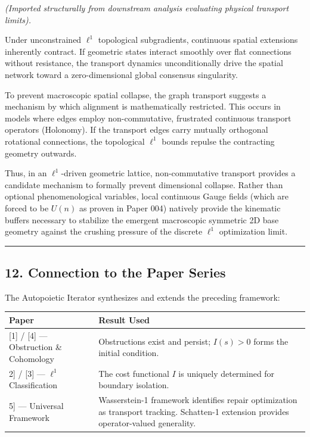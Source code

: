 \documentclass[
]{article}
\begin{document}
\emph{(Imported structurally from downstream analysis evaluating
physical transport limits).}

Under unconstrained \(\ell^1\) topological subgradients, continuous
spatial extensions inherently contract. If geometric states interact
smoothly over flat connections without resistance, the transport
dynamics unconditionally drive the spatial network toward a
zero-dimensional global consensus singularity.

To prevent macroscopic spatial collapse, the graph transport suggests a
mechanism by which alignment is mathematically restricted. This occurs
in models where edges employ non-commutative, frustrated continuous
transport operators (Holonomy). If the transport edges carry mutually
orthogonal rotational connections, the topological \(\ell^1\) bounds
repulse the contracting geometry outwards.

Thus, in an \(\ell^1\)-driven geometric lattice, non-commutative
transport provides a candidate mechanism to formally prevent dimensional
collapse. Rather than optional phenomenological variables, local
continuous Gauge fields (which are forced to be \(U(n)\) as proven in
Paper 004) natively provide the kinematic buffers necessary to stabilize
the emergent macroscopic symmetric 2D base geometry against the crushing
pressure of the discrete \(\ell^1\) optimization limit.

\begin{center}\rule{0.5\linewidth}{0.5pt}\end{center}

\subsection{12. Connection to the Paper
Series}\label{connection-to-the-paper-series}

The Autopoietic Iterator synthesizes and extends the preceding
framework:

\begin{longtable}[]{@{}
  >{\raggedright\arraybackslash}p{}
  >{\raggedright\arraybackslash}p{}@{}}
\toprule\noalign{}
\begin{minipage}[b]{\linewidth}\raggedright
Paper
\end{minipage} & \begin{minipage}[b]{\linewidth}\raggedright
Result Used
\end{minipage} \\
\midrule\noalign{}
\endhead
\bottomrule\noalign{}
\endlastfoot
{[}1{]} / {[}4{]} --- Obstruction \& Cohomology & Obstructions exist and
persist; \(I(s) > 0\) forms the initial condition. \\
{[}2{]} / {[}3{]} --- \(\ell^1\) Classification & The cost functional
\(I\) is uniquely determined for boundary isolation. \\
{[}5{]} --- Universal Framework & Wasserstein-1 framework identifies
repair optimization as transport tracking. Schatten-1 extension provides
operator-valued generality. \\
\end{longtable}
\end{document}
